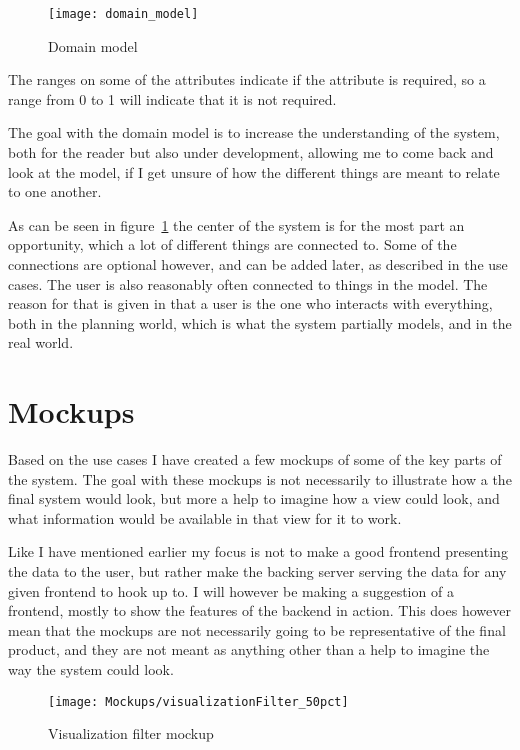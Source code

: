 \begin{figure}[h]
  \centering
  \texttt{[image: domain\_model]}
  \caption{Domain model}
  \label{fig:domain_model}
\end{figure}

The ranges on some of the attributes indicate if the attribute is required, so a range from 0 to 1 will indicate that it is not required.

The goal with the domain model is to increase the understanding of the system, both for the reader but also under development, allowing me to come back and look at the model, if I get unsure of how the different things are meant to relate to one another.

As can be seen in figure~\ref{fig:domain_model} the center of the system is for the most part an opportunity, which a lot of different things are connected to. Some of the connections are optional however, and can be added later, as described in the use cases. The user is also reasonably often connected to things in the model. The reason for that is given in that a user is the one who interacts with everything, both in the planning world, which is what the system partially models, and in the real world.

\section{Mockups}
\label{sec:Mockups}
Based on the use cases I have created a few mockups of some of the key parts of the system. The goal with these mockups is not necessarily to illustrate how a the final system would look, but more a help to imagine how a view could look, and what information would be available in that view for it to work.

Like I have mentioned earlier my focus is not to make a good frontend presenting the data to the user, but rather make the backing server serving the data for any given frontend to hook up to. I will however be making a suggestion of a frontend, mostly to show the features of the backend in action. This does however mean that the mockups are not necessarily going to be representative of the final product, and they are not meant as anything other than a help to imagine the way the system could look.

\begin{figure}
  \centering
  \texttt{[image: Mockups/visualizationFilter\_50pct]}
  \caption{Visualization filter mockup}
  \label{fig:VisualizationFilter}
\end{figure}

